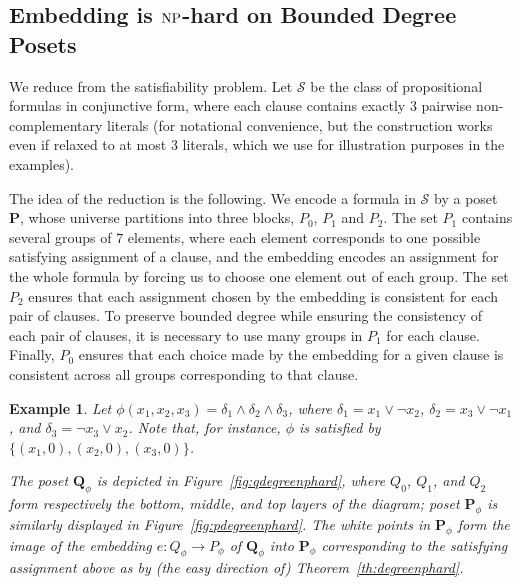 \documentclass[usletter]{article}
\newcommand{\longversion}[1]{#1}
\newcommand{\shortversion}[1]{}
\newcommand{\longshort}[2]{\longversion{#1}\shortversion{#2}}
\newcommand{\pp}{\mathbf{P}}
\newcommand{\qq}{\mathbf{Q}}
\newtheorem{example}{Example}
\begin{document}
\longversion{\pfwidthnphard}


\subsection{Embedding is $\textup{NP}$-hard on Bounded Degree Posets}\label{sect:degreenphard}

\longshort{We reduce from the satisfiability problem. Let $\mathcal{S}$ be the class of propositional formulas in conjunctive form, 
where each clause contains exactly $3$ pairwise non-complementary literals (for notational convenience, 
but the construction works even if relaxed to at most $3$ literals, 
which we use for illustration purposes in the examples).}{We reduce from the satisfiability problem. Let $\mathcal{S}$ be the class of propositional formulas in conjunctive form, 
where each clause contains exactly $3$ pairwise non-complementary literals.} 

\newcommand{\exdegreenphard}[0]{
\begin{example}\label{ex:degreenphard}
Let $\phi(x_1,x_2,x_3)=\delta_1 \wedge \delta_2 \wedge \delta_3$, 
where 
$\delta_1=x_1 \vee \neg x_2$, 
$\delta_2=x_3 \vee \neg x_1$, and 
$\delta_3=\neg x_3 \vee x_2$.  Note that, for instance, 
$\phi$ is satisfied by $\{(x_1,0),(x_2,0),(x_3,0)\}$.  

The poset $\qq_{\phi}$ is depicted in Figure~\ref{fig:qdegreenphard}, 
where $Q_0$, $Q_1$, and $Q_2$ form respectively the bottom, middle, and top layers of the diagram; 
poset $\pp_{\phi}$ is similarly displayed in Figure~\ref{fig:pdegreenphard}.  
The white points in $\pp_{\phi}$ form the image of the 
embedding $e \colon Q_{\phi} \to P_{\phi}$ of $\qq_{\phi}$ into $\pp_{\phi}$ corresponding 
to the satisfying assignment above as by (the easy direction of) Theorem~\ref{th:degreenphard}.  
\end{example}}

The idea of the reduction is the following.  We encode a formula in $\mathcal{S}$ by a poset $\pp$, 
whose universe partitions into three blocks, $P_0$, $P_1$ and $P_2$. 
The set $P_1$ contains several groups of $7$ elements, 
where each element corresponds to one possible satisfying assignment of a clause, and the embedding 
encodes an assignment for the whole formula by forcing us to choose one element out of each group. 
The set $P_2$ ensures that each assignment chosen by the embedding is consistent for each pair of clauses. 
To preserve bounded degree while ensuring the consistency of each pair of clauses, 
it is necessary to use many groups in $P_1$ for each clause. Finally, 
$P_0$ ensures that each choice made by the embedding for a given clause is consistent across all groups corresponding to that clause.  
\longversion{\exdegreenphard}
\end{document}
